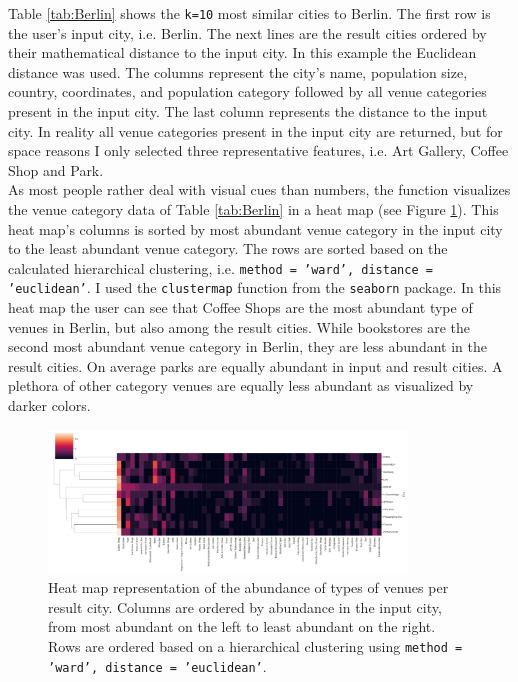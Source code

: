 \documentclass[11pt,a4paper,final]{article}
\begin{document}
Table \ref{tab:Berlin} shows the \texttt{k=10} most similar cities to Berlin. The first row is the user's input city, i.e. Berlin. The next lines are the result cities ordered by their mathematical distance to the input city. In this example the Euclidean distance was used. The columns represent the city's name, population size, country, coordinates, and population category followed by all venue categories present in the input city. The last column represents the distance to the input city. In reality all venue categories present in the input city are returned, but for space reasons I only selected three representative features, i.e. Art Gallery, Coffee Shop and Park.\\
As most people rather deal with visual cues than numbers, the function visualizes the venue category data of Table \ref{tab:Berlin} in a heat map (see Figure \ref{fig:heatmap}). This heat map's columns is sorted by most abundant venue category in the input city to the least abundant venue category. The rows are sorted based on the calculated hierarchical clustering, i.e. \texttt{method = 'ward', distance = 'euclidean'}. I used the \texttt{clustermap} function from the \texttt{seaborn} package.
In this heat map the user can see that Coffee Shops are the most abundant type of venues in Berlin, but also among the result cities. While bookstores are the second most abundant venue category in Berlin, they are less abundant in the result cities. On average parks are equally abundant in input and result cities. A plethora of other category venues are equally less abundant as visualized by darker colors.

\begin{figure}[h!]
\begin{center}
\includegraphics[width = 0.85\textwidth]{figures/heatmap_BERLIN.pdf}
\caption{Heat map representation of the abundance of types of venues per result city. Columns are ordered by abundance in the input city, from most abundant on the left to least abundant on the right. Rows are ordered based on a hierarchical clustering using \texttt{method = 'ward', distance = 'euclidean'}.}\label{fig:heatmap}
\end{center}
\end{figure}
\end{document}

